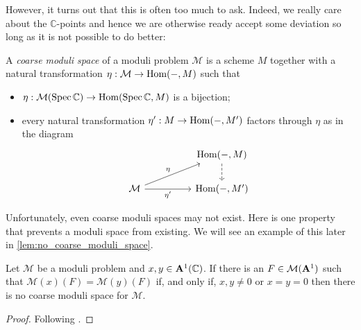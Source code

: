 \documentclass[12pt]{ociamthesis}  %
\begin{document}
\begin{example}
  \missingexample
\end{example}

However, it turns out that this is often too much to ask. Indeed,
we really care about the $\mathbb{C}$-points and hence
we are otherwise ready accept some deviation so long as it is not
possible to do better:

\begin{definition}\missingcitation
  A \emph{coarse moduli space} of a moduli problem $\mathcal M$
  is a scheme $M$ together with a natural transformation
  $\eta : \mathcal M \to \operatorname{Hom}(-,M)$ such that
  \begin{itemize}
    \item $\eta : \mathcal M(\operatorname{Spec}\mathbb{C})\to \operatorname{Hom}(\operatorname{Spec}\mathbb{C},M)$ is a bijection;
    \item every natural transformation $\eta' : M \to \operatorname{Hom}(-,M')$ factors through
          $\eta$ as in the diagram
          \begin{equation*}
            \begin{tikzcd}
              && {\text{Hom}(-,M)} \\
              {\mathcal M} && {\text{Hom}(-,M')}
              \arrow[dashed, from=1-3, to=2-3]
              \arrow["\eta", from=2-1, to=1-3]
              \arrow["{\eta'}"', from=2-1, to=2-3]
            \end{tikzcd}
          \end{equation*}
  \end{itemize}
\end{definition}

\begin{example}
  \missingexample
\end{example}

Unfortunately, even coarse moduli spaces may not exist. Here is
one property that prevents a moduli space from existing. We will
see an example of this later in \ref{lem:no_coarse_moduli_space}.

\begin{lemma}\label{lem:no_coarse_condition}
  Let $\mathcal M$ be a moduli problem and
  $x,y\in \mathbf{A}^{1}_{}(\mathbb{C})$. If there is an
  $F\in\mathcal M(\mathbf{A}^{1}_{})$ such that
  $\mathcal M(x)(F) = \mathcal M(y)(F)$ if, and only if,
  $x,y\neq 0$ or $x=y=0$ then there is no coarse moduli space
  for $\mathcal M$.
  \begin{proof}
    Following \cite[Lemma 2.27]{hoskins2016}.
    \missingproof
  \end{proof}
\end{lemma}
\end{document}
